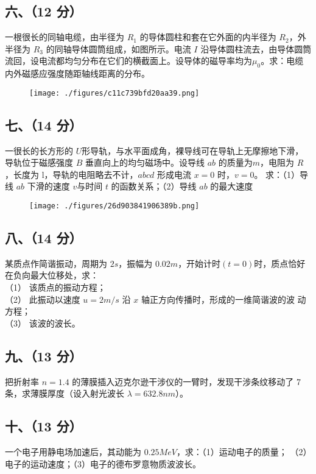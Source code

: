 \subsection{六、（12 分）}
一根很长的同轴电缆，由半径为 $R_1$ 的导体圆柱和套在它外面的内半径为 $R_2$，外半径为 $R_3$ 的同轴导体圆筒组成，如图所示。电流 $I$ 沿导体圆柱流去，由导体圆筒流回，设电流都均匀分布在它们的横截面上。设导体的磁导率均为$\mu_0$。求：电缆内外磁感应强度随距轴线距离的分布。
\begin{figure}[ht]
\centering
\texttt{[image: ./figures/c11c739bfd20aa39.png]}
\caption{} \label{fig_NJUD2_8}
\end{figure}
\subsection{七、（14 分）}
一很长的长方形的 $U$形导轨，与水平面成角，裸导线可在导轨上无摩擦地下滑，导轨位于磁感强度 $B$ 垂直向上的均匀磁场中。设导线 $ab$ 的质量为$m$，电阻为 $R$，长度为 l，导轨的电阻略去不计，$abcd$ 形成电流 $x=0$ 时，$v=0$。
求：（1）导线 $ab$ 下滑的速度 $v$与时间 $t$ 的函数关系；（2）导线 $ab$ 的最大速度
\begin{figure}[ht]
\centering
\texttt{[image: ./figures/26d903841906389b.png]}
\caption{} \label{fig_NJUD2_9}
\end{figure}
\subsection{八、（14 分）}
某质点作简谐振动，周期为 $2s$，振幅为 $0.02m$，开始计时$(t=0)$时，质点恰好在负向最大位移处，求：\\
（1） 该质点的振动方程；\\
（2） 此振动以速度 $u=2m/s$ 沿 $x$ 轴正方向传播时，形成的一维简谐波的波
动方程；\\
（3） 该波的波长。
\subsection{九、（13 分）}
把折射率 $n=1.4$ 的薄膜插入迈克尔逊干涉仪的一臂时，发现干涉条纹移动了 7 条，求薄膜厚度（设入射光波长 $\lambda=632.8nm$）。
\subsection{十、（13 分）}
一个电子用静电场加速后，其动能为 $0.25MeV$，求：（1）运动电子的质量；
（2）电子的运动速度；（3）电子的德布罗意物质波波长。